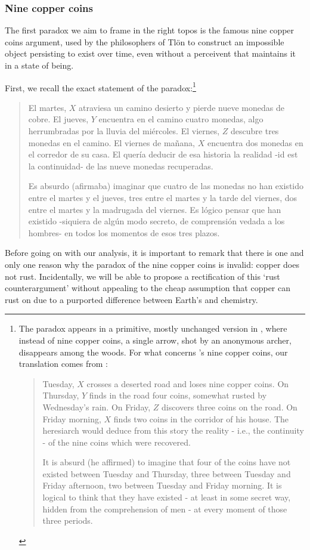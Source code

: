 \subsubsection{Nine copper coins} The first paradox we aim to frame in the right topos is the famous nine copper coins argument, used by the philosophers of Tlön to construct an impossible object persisting to exist over time, even without a perceivent that maintains it in a state of being.
\begin{example}\label{bla}
	First, we recall the exact statement of the paradox:\footnote{The paradox appears in a primitive, mostly unchanged version in \cite{borges1997otras}, where instead of nine copper coins, a single arrow, shot by an anonymous archer, disappears among the woods. For what concerns \tlon's  nine copper coins, our translation comes from \cite{tlonEN}:
		\begin{quote}
			Tuesday, $X$ crosses a deserted road and loses nine copper coins. On Thursday, $Y$ finds in the road four coins, somewhat rusted by Wednesday's rain. On Friday, $Z$ discovers three coins on the road. On Friday morning, $X$ finds two coins in the corridor of his house. The heresiarch would deduce from this story the reality - i.e., the continuity - of the nine coins which were recovered.

			It is absurd (he affirmed) to imagine that four of the coins have not existed between Tuesday and Thursday, three between Tuesday and Friday afternoon, two between Tuesday and Friday morning. It is logical to think that they have existed - at least in some secret way, hidden from the comprehension of men - at every moment of those three periods.
		\end{quote}}
	\begin{quote}
		El martes, $X$ atraviesa un camino desierto y pierde nueve monedas de cobre.
		El jueves, $Y$ encuentra en el camino cuatro monedas, algo herrumbradas por la lluvia del miércoles. El viernes, $Z$ descubre tres monedas en el camino. El viernes de mañana, $X$ encuentra dos monedas en el corredor de su casa. El  quería deducir de esa historia la realidad -id est la continuidad- de las nueve monedas recuperadas.

		Es absurdo (afirmaba) imaginar que cuatro de las monedas no han existido entre el martes y el jueves, tres entre el martes y la tarde del viernes, dos entre el martes y la madrugada del viernes. Es lógico pensar que han existido -siquiera de algún modo secreto, de comprensión vedada a los hombres- en todos los momentos de esos tres plazos.
	\end{quote}
	Before going on with our analysis, it is important to remark that there is one and only one reason why the paradox of the nine copper coins is invalid: copper does not rust. Incidentally, we will be able to propose a rectification of this `rust counterargument' without appealing to the cheap assumption that copper can rust on \tlon due to a purported difference between Earth's and \tlonian chemistry.


\end{example}
